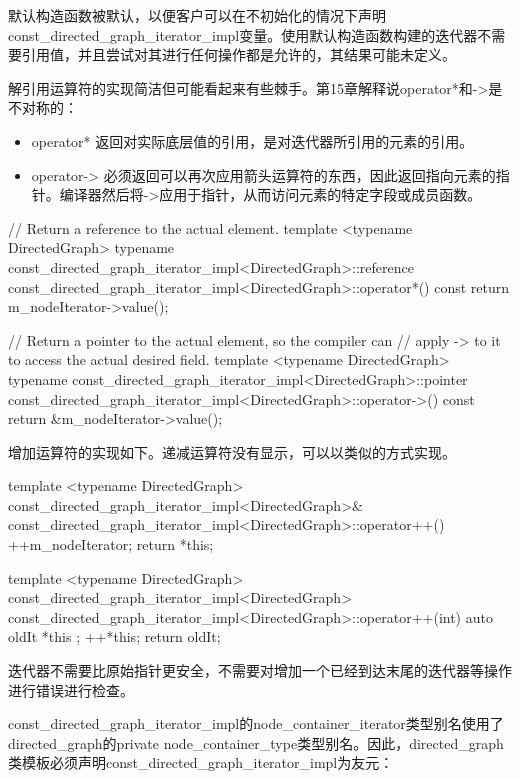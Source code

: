 默认构造函数被默认，以便客户可以在不初始化的情况下声明const\_directed\_graph\_iterator\_impl变量。使用默认构造函数构建的迭代器不需要引用值，并且尝试对其进行任何操作都是允许的，其结果可能未定义。

解引用运算符的实现简洁但可能看起来有些棘手。第15章解释说operator*和->是不对称的：

\begin{itemize}
\item
operator* 返回对实际底层值的引用，是对迭代器所引用的元素的引用。

\item
operator-> 必须返回可以再次应用箭头运算符的东西，因此返回指向元素的指针。编译器然后将->应用于指针，从而访问元素的特定字段或成员函数。
\end{itemize}

\begin{cpp}
// Return a reference to the actual element.
template <typename DirectedGraph>
typename const_directed_graph_iterator_impl<DirectedGraph>::reference
    const_directed_graph_iterator_impl<DirectedGraph>::operator*() const
{
    return m_nodeIterator->value();
}

// Return a pointer to the actual element, so the compiler can
// apply -> to it to access the actual desired field.
template <typename DirectedGraph>
typename const_directed_graph_iterator_impl<DirectedGraph>::pointer
    const_directed_graph_iterator_impl<DirectedGraph>::operator->() const
{
    return &m_nodeIterator->value();
}
\end{cpp}

增加运算符的实现如下。递减运算符没有显示，可以以类似的方式实现。

\begin{cpp}
template <typename DirectedGraph>
const_directed_graph_iterator_impl<DirectedGraph>&
    const_directed_graph_iterator_impl<DirectedGraph>::operator++()
{
    ++m_nodeIterator;
    return *this;
}

template <typename DirectedGraph>
const_directed_graph_iterator_impl<DirectedGraph>
    const_directed_graph_iterator_impl<DirectedGraph>::operator++(int)
{
    auto oldIt { *this };
    ++*this;
    return oldIt;
}
\end{cpp}

迭代器不需要比原始指针更安全，不需要对增加一个已经到达末尾的迭代器等操作进行错误进行检查。

const\_directed\_graph\_iterator\_impl的node\_container\_iterator类型别名使用了directed\_graph的private node\_container\_type类型别名。因此，directed\_graph类模板必须声明const\_directed\_graph\_iterator\_impl为友元：

